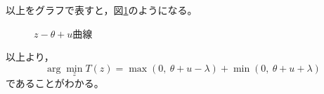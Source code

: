 \documentclass[class=jsarticle, crop=false, dvipdfmx, fleqn]{standalone}
\begin{document}
以上をグラフで表すと，図\ref{fig:z_theta_curve}のようになる。

\begin{figure}
    \centering
    
    \caption{\(z - \theta+u\)曲線}
    \label{fig:z_theta_curve}
\end{figure}

以上より，
\begin{equation}
    \arg\min_z T(z) = \max(0,\ \theta + u - \lambda) + \min(0,\ \theta + u + \lambda)
\end{equation}
であることがわかる。
\end{document}
